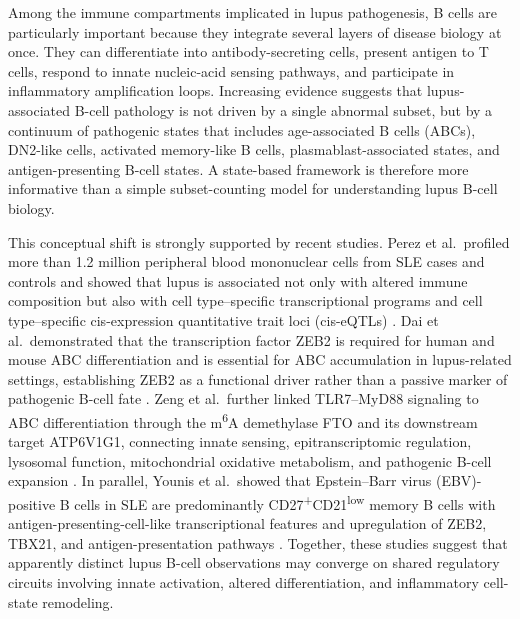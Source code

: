 \documentclass[12pt, a4paper]{article}
\begin{document}
Among the immune compartments implicated in lupus pathogenesis, B cells are particularly important because they integrate several layers of disease biology at once. They can differentiate into antibody-secreting cells, present antigen to T cells, respond to innate nucleic-acid sensing pathways, and participate in inflammatory amplification loops. Increasing evidence suggests that lupus-associated B-cell pathology is not driven by a single abnormal subset, but by a continuum of pathogenic states that includes age-associated B cells (ABCs), DN2-like cells, activated memory-like B cells, plasmablast-associated states, and antigen-presenting B-cell states. A state-based framework is therefore more informative than a simple subset-counting model for understanding lupus B-cell biology.

This conceptual shift is strongly supported by recent studies. Perez et al.\ profiled more than 1.2 million peripheral blood mononuclear cells from SLE cases and controls and showed that lupus is associated not only with altered immune composition but also with cell type--specific transcriptional programs and cell type--specific cis-expression quantitative trait loci (cis-eQTLs) \cite{Perez2022}. Dai et al.\ demonstrated that the transcription factor ZEB2 is required for human and mouse ABC differentiation and is essential for ABC accumulation in lupus-related settings, establishing ZEB2 as a functional driver rather than a passive marker of pathogenic B-cell fate \cite{Dai2024}. Zeng et al.\ further linked TLR7--MyD88 signaling to ABC differentiation through the m\textsuperscript{6}A demethylase FTO and its downstream target ATP6V1G1, connecting innate sensing, epitranscriptomic regulation, lysosomal function, mitochondrial oxidative metabolism, and pathogenic B-cell expansion \cite{Zeng2025}. In parallel, Younis et al.\ showed that Epstein--Barr virus (EBV)-positive B cells in SLE are predominantly CD27\textsuperscript{+}CD21\textsuperscript{low} memory B cells with antigen-presenting-cell-like transcriptional features and upregulation of ZEB2, TBX21, and antigen-presentation pathways \cite{Younis2025}. Together, these studies suggest that apparently distinct lupus B-cell observations may converge on shared regulatory circuits involving innate activation, altered differentiation, and inflammatory cell-state remodeling.
\end{document}
